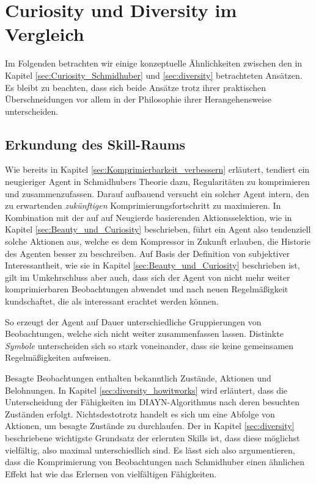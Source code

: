 \section{Curiosity und Diversity im Vergleich}
\label{sec:comparison}
Im Folgenden betrachten wir einige konzeptuelle Ähnlichkeiten zwischen den in Kapitel \ref{sec:Curiosity_Schmidhuber} und \ref{sec:diversity} betrachteten Ansätzen.
Es bleibt zu beachten, dass sich beide Ansätze trotz ihrer praktischen Überschneidungen vor allem in der Philosophie ihrer Herangehensweise unterscheiden.

\subsection{Erkundung des Skill-Raums}
\label{sec:comparison_theory}

Wie bereits in Kapitel \ref{sec:Komprimierbarkeit_verbessern} erläutert, tendiert ein neugieriger Agent in Schmidhubers Theorie dazu, Regularitäten zu komprimieren und zusammenzufassen. Darauf aufbauend versucht ein solcher Agent intern, den zu erwartenden \emph{zukünftigen} Komprimierungsfortschritt zu maximieren. 
In Kombination mit der auf auf Neugierde basierenden Aktionsselektion, wie in Kapitel \ref{sec:Beauty_und_Curiosity} beschrieben, führt ein Agent also tendenziell solche Aktionen aus, welche es dem Kompressor in Zukunft erlauben, die Historie des Agenten besser zu beschreiben. 
Auf Basis der Definition von subjektiver Interessantheit, wie sie in Kapitel \ref{sec:Beauty_und_Curiosity} beschrieben ist, gilt im Umkehrschluss aber auch, dass sich der Agent von nicht mehr weiter komprimierbaren Beobachtungen abwendet und nach neuen Regelmäßigkeit kundschaftet, die als interessant erachtet werden können.

So erzeugt der Agent auf Dauer unterschiedliche Gruppierungen von Beobachtungen, welche sich nicht weiter zusammenfassen lassen. Distinkte \emph{Symbole} unterscheiden sich so stark voneinander, dass sie keine gemeinsamen Regelmäßigkeiten aufweisen.

Besagte Beobachtungen enthalten bekanntlich Zustände, Aktionen und Belohnungen. In Kapitel \ref{sec:diversity_howitworks} wird erläutert, dass die Unterscheidung der Fähigkeiten im DIAYN-Algorithmus nach deren besuchten Zuständen erfolgt. Nichtsdestotrotz handelt es sich um eine Abfolge von Aktionen, um besagte Zustände zu durchlaufen. Der in Kapitel \ref{sec:diversity} beschriebene wichtigste Grundsatz der erlernten Skills ist, dass diese möglichst vielfältig, also maximal unterschiedlich sind. Es lässt sich also argumentieren, dass die Komprimierung von Beobachtungen nach Schmidhuber einen ähnlichen Effekt hat wie das Erlernen von vielfältigen Fähigkeiten.

